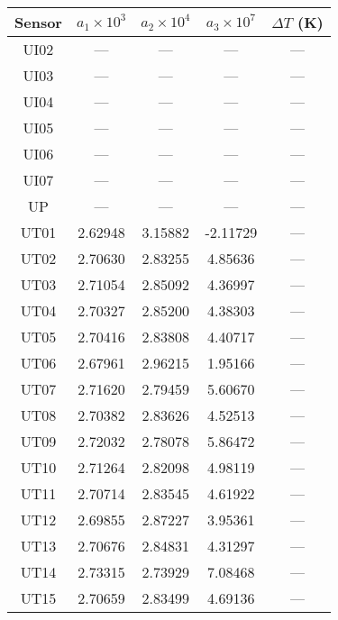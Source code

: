 \documentclass[utf8]{article}
\begin{document}
    \begin{table}
      \label{tab:calibration}
      \begin{minipage}[b]{85mm}
        \begin{tabular}{ccccc}
          \hline
          Sensor & $a_1\times10^{3}$ & $a_2\times10^{4}$
                 & $a_3\times10^{7}$ & $\Delta T$ (K) \\
          \hline
          UI02 &   ---   &   ---   &   ---   &     ---   \\
          UI03 &   ---   &   ---   &   ---   &     ---   \\
          UI04 &   ---   &   ---   &   ---   &     ---   \\
          UI05 &   ---   &   ---   &   ---   &     ---   \\
          UI06 &   ---   &   ---   &   ---   &     ---   \\
          UI07 &   ---   &   ---   &   ---   &     ---   \\
          UP   &   ---   &   ---   &   ---   &     ---   \\
          UT01 & 2.62948 & 3.15882 &-2.11729 &     ---   \\
          UT02 & 2.70630 & 2.83255 & 4.85636 &     ---   \\
          UT03 & 2.71054 & 2.85092 & 4.36997 &     ---   \\
          UT04 & 2.70327 & 2.85200 & 4.38303 &     ---   \\
          UT05 & 2.70416 & 2.83808 & 4.40717 &     ---   \\
          UT06 & 2.67961 & 2.96215 & 1.95166 &     ---   \\
          UT07 & 2.71620 & 2.79459 & 5.60670 &     ---   \\
          UT08 & 2.70382 & 2.83626 & 4.52513 &     ---   \\
          UT09 & 2.72032 & 2.78078 & 5.86472 &     ---   \\
          UT10 & 2.71264 & 2.82098 & 4.98119 &     ---   \\
          UT11 & 2.70714 & 2.83545 & 4.61922 &     ---   \\
          UT12 & 2.69855 & 2.87227 & 3.95361 &     ---   \\
          UT13 & 2.70676 & 2.84831 & 4.31297 &     ---   \\
          UT14 & 2.73315 & 2.73929 & 7.08468 &     ---   \\
          UT15 & 2.70659 & 2.83499 & 4.69136 &     ---   \\

\end{tabular}
\end{minipage}
\end{table}
\end{document}
